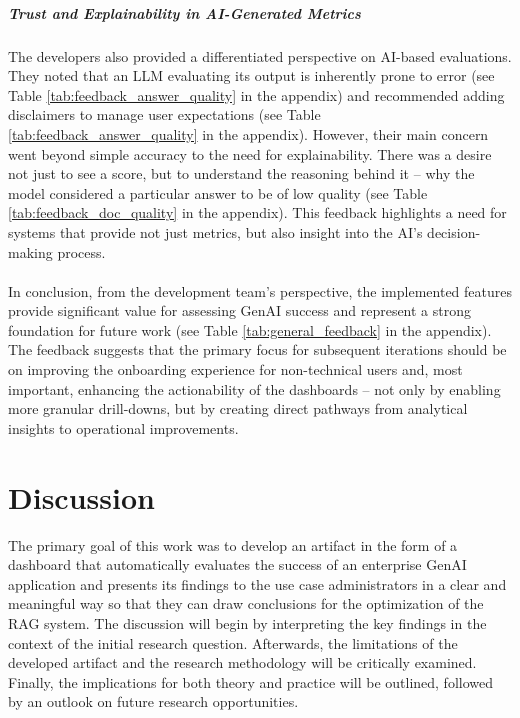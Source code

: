 \documentclass[
	english,
	ruledheaders=section,%
	class=report,%
	thesis={type=bachelor},%
	accentcolor=1b,%
	custommargins=true,%
	marginpar=false,%
	parskip=half-,%
	fontsize=11pt,%
	DIV=14,
]{tudapub}
\begin{document}
\paragraph{Trust and Explainability in AI-Generated Metrics} The developers also provided a differentiated perspective on AI-based evaluations. They noted that an LLM evaluating its output is inherently prone to error (see Table \ref{tab:feedback_answer_quality} in the appendix) and recommended adding disclaimers to manage user expectations (see Table \ref{tab:feedback_answer_quality} in the appendix). However, their main concern went beyond simple accuracy to the need for explainability. There was a desire not just to see a score, but to understand the reasoning behind it -- why the model considered a particular answer to be of low quality (see Table \ref{tab:feedback_doc_quality} in the appendix). This feedback highlights a need for systems that provide not just metrics, but also insight into the AI's decision-making process.\\
\\
In conclusion, from the development team's perspective, the implemented features provide significant value for assessing GenAI success and represent a strong foundation for future work (see Table \ref{tab:general_feedback} in the appendix). The feedback suggests that the primary focus for subsequent iterations should be on improving the onboarding experience for non-technical users and, most important, enhancing the actionability of the dashboards -- not only by enabling more granular drill-downs, but by creating direct pathways from analytical insights to operational improvements.

\chapter{Discussion}
The primary goal of this work was to develop an artifact in the form of a dashboard that automatically evaluates the success of an enterprise GenAI application and presents its findings to the use case administrators in a clear and meaningful way so that they can draw conclusions for the optimization of the RAG system. The discussion will begin by interpreting the key findings in the context of the initial research question. Afterwards, the limitations of the developed artifact and the research methodology will be critically examined. Finally, the implications for both theory and practice will be outlined, followed by an outlook on future research opportunities.
\end{document}
